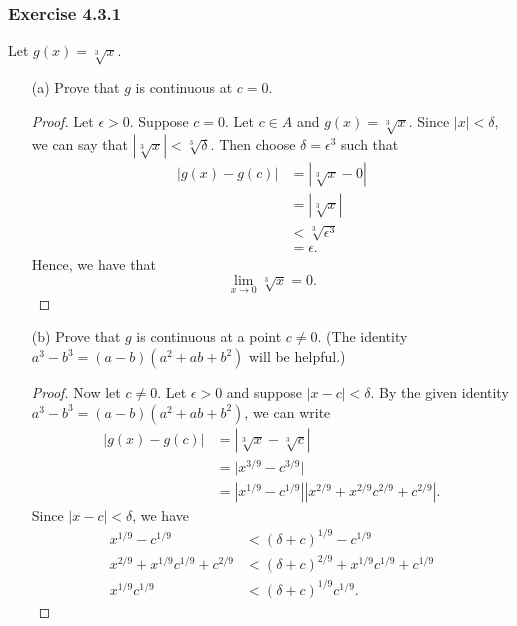 \subsubsection{Exercise 4.3.1} Let \( g(x) = \sqrt[3]{x }  \).
\begin{enumerate}
    \item[(a)] Prove that \( g \) is continuous at \( c = 0  \).
        \begin{proof}
            Let \( \epsilon > 0  \). Suppose \( c = 0  \). Let \( c \in A  \) and \( g(x) = \sqrt[3]{ x }  \). Since \( | x | < \delta  \), we can say that \( |\sqrt[3]{ x }| < \sqrt[3]{ \delta }   \). Then choose \( \delta = \epsilon^3 \) such that 
            \begin{align*}
                | g(x)  - g(c) | &= | \sqrt[3]{ x } - 0  |  \\
                                 &= | \sqrt[3]{ x }  |  \\
                                 &< \sqrt[3]{ \epsilon^3 } \\
                                 &= \epsilon.
            \end{align*}
            Hence, we have that 
            \[  \lim_{ x \to 0 } \sqrt[3]{ x } = 0 . \]
        \end{proof}
    \item[(b)] Prove that \( g  \) is continuous at a point \( c \neq 0  \). (The identity \( a^3 - b^3 = (a-b)(a^2 + ab + b^2)  \) will be helpful.)
        \begin{proof}
        Now let \( c \neq  0  \). Let \( \epsilon > 0  \) and suppose \( | x - c  | < \delta \). By the given identity \( a^3 - b^3 = (a-b)(a^2 +ab +b^2) \), we can write 
        \begin{align*}
            | g(x) - g(c) | &= | \sqrt[3]{x} - \sqrt[3]{c}     |  \\
                            &= \Big| x^{3/9} - c^{3/9} \Big| \\  
                            &= | x^{1/9} - c^{1/9} | | x^{2/9} + x^{2/9}c^{2/9} + c^{2/9} |.
        \end{align*}
        Since \( | x - c  | < \delta \), we have 
        \begin{align*}
            x^{1/9} - c^{1/9}  &< (\delta + c)^{1/9} - c^{1/9} \tag{1}  \\
            x^{2/9} +x^{1/9}c^{1/9} + c^{2/9}  &< (\delta + c )^{2/9} + x^{1/9}c^{1/9} + c^{1/9} \tag{2} \\
            x^{1/9} c^{1/9} &< (\delta + c )^{1/9} c^{1/9} \tag{3}.

\end{align*}
\end{proof}
\end{enumerate}
